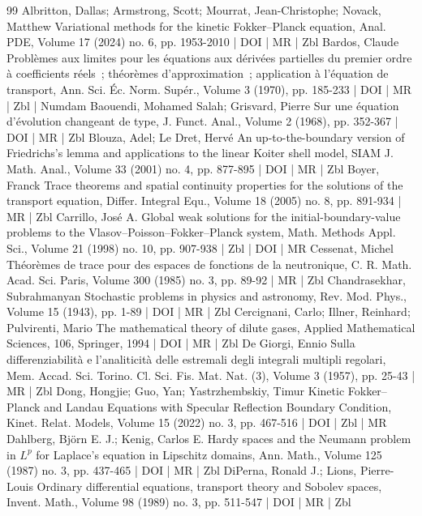 \begin{thebibliography}{99}
 Albritton, Dallas; Armstrong, Scott; Mourrat, Jean-Christophe; Novack, Matthew Variational methods for the kinetic Fokker–Planck equation, Anal. PDE, Volume 17 (2024) no. 6, pp. 1953-2010 | DOI | MR | Zbl
 Bardos, Claude Problèmes aux limites pour les équations aux dérivées partielles du premier ordre à coefficients réels ; théorèmes d’approximation ; application à l’équation de transport, Ann. Sci. Éc. Norm. Supér., Volume 3 (1970), pp. 185-233 | DOI | MR | Zbl | Numdam
 Baouendi, Mohamed Salah; Grisvard, Pierre Sur une équation d’évolution changeant de type, J. Funct. Anal., Volume 2 (1968), pp. 352-367 | DOI | MR | Zbl
 Blouza, Adel; Le Dret, Hervé An up-to-the-boundary version of Friedrichs’s lemma and applications to the linear Koiter shell model, SIAM J. Math. Anal., Volume 33 (2001) no. 4, pp. 877-895 | DOI | MR | Zbl
 Boyer, Franck Trace theorems and spatial continuity properties for the solutions of the transport equation, Differ. Integral Equ., Volume 18 (2005) no. 8, pp. 891-934 | MR | Zbl
 Carrillo, José A. Global weak solutions for the initial-boundary-value problems to the Vlasov–Poisson–Fokker–Planck system, Math. Methods Appl. Sci., Volume 21 (1998) no. 10, pp. 907-938 | Zbl | DOI | MR
 Cessenat, Michel Théorèmes de trace pour des espaces de fonctions de la neutronique, C. R. Math. Acad. Sci. Paris, Volume 300 (1985) no. 3, pp. 89-92 | MR | Zbl
 Chandrasekhar, Subrahmanyan Stochastic problems in physics and astronomy, Rev. Mod. Phys., Volume 15 (1943), pp. 1-89 | DOI | MR | Zbl
 Cercignani, Carlo; Illner, Reinhard; Pulvirenti, Mario The mathematical theory of dilute gases, Applied Mathematical Sciences, 106, Springer, 1994 | DOI | MR | Zbl
 De Giorgi, Ennio Sulla differenziabilità e l’analiticità delle estremali degli integrali multipli regolari, Mem. Accad. Sci. Torino. Cl. Sci. Fis. Mat. Nat. (3), Volume 3 (1957), pp. 25-43 | MR | Zbl
 Dong, Hongjie; Guo, Yan; Yastrzhembskiy, Timur Kinetic Fokker–Planck and Landau Equations with Specular Reflection Boundary Condition, Kinet. Relat. Models, Volume 15 (2022) no. 3, pp. 467-516 | DOI | Zbl | MR
 Dahlberg, Björn E. J.; Kenig, Carlos E. Hardy spaces and the Neumann problem in ${L}^p$ for Laplace’s equation in Lipschitz domains, Ann. Math., Volume 125 (1987) no. 3, pp. 437-465 | DOI | MR | Zbl
 DiPerna, Ronald J.; Lions, Pierre-Louis Ordinary differential equations, transport theory and Sobolev spaces, Invent. Math., Volume 98 (1989) no. 3, pp. 511-547 | DOI | MR | Zbl

\end{thebibliography}
